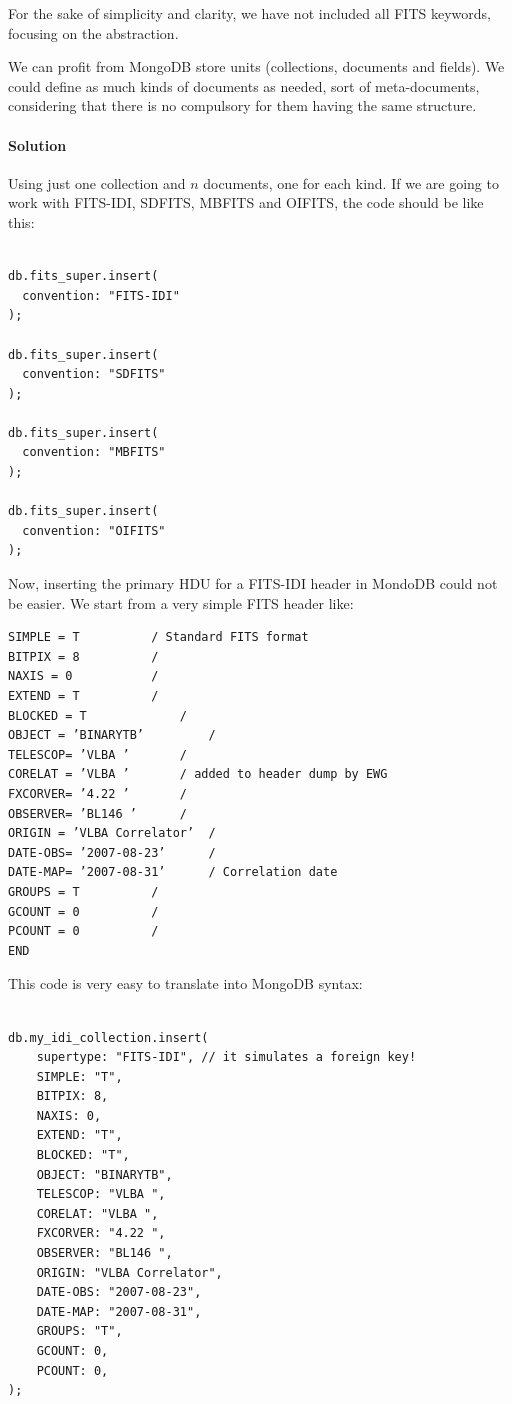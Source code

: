 For the sake of simplicity and clarity, we have not included all FITS keywords, focusing on the abstraction.

We can profit from MongoDB store units (collections, documents and fields). We could define as much kinds of documents as needed, sort of meta-documents, considering that there is no compulsory for them having the same structure. 

\paragraph{Solution}

Using just one collection and $n$ documents, one for each kind. If we are going to work with FITS-IDI, SDFITS, MBFITS and OIFITS, the code should be like this:

\begin{lstlisting}

db.fits_super.insert(
  convention: "FITS-IDI"
);

db.fits_super.insert(
  convention: "SDFITS"
);

db.fits_super.insert(
  convention: "MBFITS"
);

db.fits_super.insert(
  convention: "OIFITS"
);

\end{lstlisting}




Now, inserting the primary HDU for a  FITS-IDI header in MondoDB could not be easier. We start from a very simple FITS header like: 
\begin{verbatim}
SIMPLE = T 			/ Standard FITS format
BITPIX = 8 			/
NAXIS = 0 			/
EXTEND = T 			/
BLOCKED = T 			/
OBJECT = ’BINARYTB’ 		/
TELESCOP= ’VLBA ’ 		/
CORELAT = ’VLBA ’ 		/ added to header dump by EWG
FXCORVER= ’4.22 ’ 		/
OBSERVER= ’BL146 ’ 		/
ORIGIN = ’VLBA Correlator’ 	/
DATE-OBS= ’2007-08-23’ 		/
DATE-MAP= ’2007-08-31’ 		/ Correlation date
GROUPS = T 			/
GCOUNT = 0 			/
PCOUNT = 0 			/
END
\end{verbatim}

This code is very easy to translate into MongoDB syntax: 

\begin{lstlisting}

db.my_idi_collection.insert(
    supertype: "FITS-IDI", // it simulates a foreign key!
    SIMPLE: "T",
    BITPIX: 8,
    NAXIS: 0,
    EXTEND: "T",
    BLOCKED: "T",
    OBJECT: "BINARYTB",
    TELESCOP: "VLBA ",
    CORELAT: "VLBA ",
    FXCORVER: "4.22 ",
    OBSERVER: "BL146 ",
    ORIGIN: "VLBA Correlator",
    DATE-OBS: "2007-08-23",
    DATE-MAP: "2007-08-31",
    GROUPS: "T",
    GCOUNT: 0,
    PCOUNT: 0,
);

\end{lstlisting}

